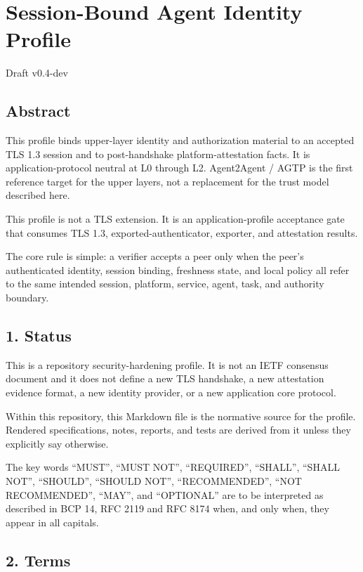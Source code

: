 \documentclass[
]{article}
\author{}
\date{}
\begin{document}
{
\setcounter{tocdepth}{3}
\tableofcontents
}
\section{Session-Bound Agent Identity
Profile}\label{session-bound-agent-identity-profile}

Draft v0.4-dev

\subsection{Abstract}\label{abstract}

This profile binds upper-layer identity and authorization material to an
accepted TLS 1.3 session and to post-handshake platform-attestation
facts. It is application-protocol neutral at L0 through L2. Agent2Agent
/ AGTP is the first reference target for the upper layers, not a
replacement for the trust model described here.

This profile is not a TLS extension. It is an application-profile
acceptance gate that consumes TLS 1.3, exported-authenticator, exporter,
and attestation results.

The core rule is simple: a verifier accepts a peer only when the peer's
authenticated identity, session binding, freshness state, and local
policy all refer to the same intended session, platform, service, agent,
task, and authority boundary.

\subsection{1. Status}\label{status}

This is a repository security-hardening profile. It is not an IETF
consensus document and it does not define a new TLS handshake, a new
attestation evidence format, a new identity provider, or a new
application core protocol.

Within this repository, this Markdown file is the normative source for
the profile. Rendered specifications, notes, reports, and tests are
derived from it unless they explicitly say otherwise.

The key words ``MUST'', ``MUST NOT'', ``REQUIRED'', ``SHALL'', ``SHALL
NOT'', ``SHOULD'', ``SHOULD NOT'', ``RECOMMENDED'', ``NOT RECOMMENDED'',
``MAY'', and ``OPTIONAL'' are to be interpreted as described in BCP 14,
RFC 2119 and RFC 8174 when, and only when, they appear in all capitals.

\subsection{2. Terms}\label{terms}
\end{document}
